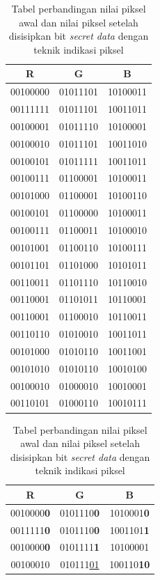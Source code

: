 \documentclass[a4paper,twoside]{article}
\begin{document}
\begin{enumerate}
\begin{itemize}
		\begin{table}[!htbp]
		\centering
		\caption{Tabel perbandingan nilai piksel awal dan nilai piksel setelah disisipkan bit \textit{secret data} dengan teknik indikasi piksel}
		\label{TabelPIT}
		\begin{tabular}{| c | c | c |}
		\hline
		R & G & B\\
		\hline
		00100000 & 01011101 & 10100011\\
		\hline
		00111111 & 01011101 & 10011011\\
		\hline
		00100001 & 01011110 & 10100001\\
		\hline
		00100010 & 01011101 & 10011010\\
		\hline
		00100101 & 01011111 & 10011011\\
		\hline
		00100111 & 01100001 & 10100011\\
		\hline
		00101000 & 01100001 & 10100110\\
		\hline
		00100101 & 01100000 & 10100011\\
		\hline
		00100111 & 01100011 & 10100010\\
		\hline
		00101001 & 01100110 & 10100111\\
		\hline
		00101101 & 01101000 & 10101011\\
		\hline
		00110011 & 01101110 & 10110010\\
		\hline
		00110001 & 01101011 & 10110001\\
		\hline
		00110001 & 01100010 & 10110011\\
		\hline
		00110110 & 01010010 & 10011011\\
		\hline
		00101000 & 01010110 & 10011001\\
		\hline
		00101010 & 01010110 & 10010100\\
		\hline
		00100010 & 01000010 & 10010001\\
		\hline
		00110101 & 01000110 & 10010111\\
		\hline
		\end{tabular}
		\quad
		\begin{tabular}{| c | c | c |}
		\hline
		R & G & B\\
		\hline
		0010000\textbf{0} & 0101110\textbf{0} & 1010001\textbf{0}\\
		\hline
		0011111\textbf{0} & 0101110\textbf{0} & 1001101\textbf{1}\\
		\hline
		0010000\textbf{0} & 0101111\textbf{1} & 10100001\\
		\hline
		00100010 & 010111\underline{01 }& 100110\textbf{10}\\

\end{tabular}
\end{table}
\end{itemize}
\end{enumerate}
\end{document}
